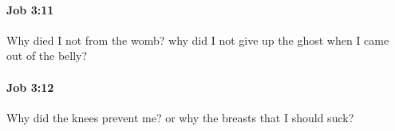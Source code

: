 		\paragraph{Job 3:11} %
			\label{JOB-3-11}

			Why died I not from the womb? why did I not give up the ghost when I came out of the belly?


		\paragraph{Job 3:12} %
			\label{JOB-3-12}

			Why did the knees prevent me? or why the breasts that I should suck?


